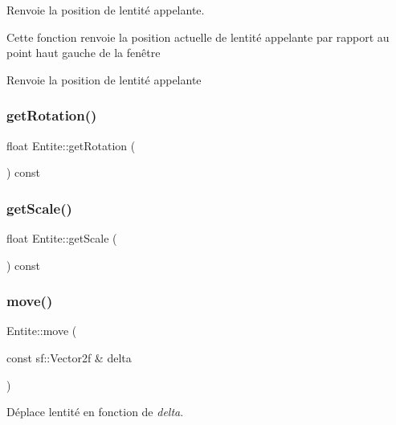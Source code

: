 Renvoie la position de l\textquotesingle{}entité appelante. 

Cette fonction renvoie la position actuelle de l\textquotesingle{}entité appelante par rapport au point haut gauche de la fenêtre \begin{DoxyReturn}{Renvoie}
la position de l\textquotesingle{}entité appelante 
\end{DoxyReturn}
\mbox{\label{class_entite_af245a50c73da19510d9a9e52cb9248a4}} 
\subsubsection{\texorpdfstring{get\+Rotation()}{getRotation()}}
{\footnotesize\ttfamily float Entite\+::get\+Rotation (\begin{DoxyParamCaption}{ }\end{DoxyParamCaption}) const}

\mbox{\label{class_entite_a95d64960088b9576b94346acd5ad6296}} 
\subsubsection{\texorpdfstring{get\+Scale()}{getScale()}}
{\footnotesize\ttfamily float Entite\+::get\+Scale (\begin{DoxyParamCaption}{ }\end{DoxyParamCaption}) const}

\mbox{\label{class_entite_ac409613f3cf67cae14babd4b16811c8f}} 
\subsubsection{\texorpdfstring{move()}{move()}}
{\footnotesize\ttfamily Entite\+::move (\begin{DoxyParamCaption}\item[{const sf\+::\+Vector2f \&}]{delta }\end{DoxyParamCaption})}



Déplace l\textquotesingle{}entité en fonction de {\itshape delta}. 

